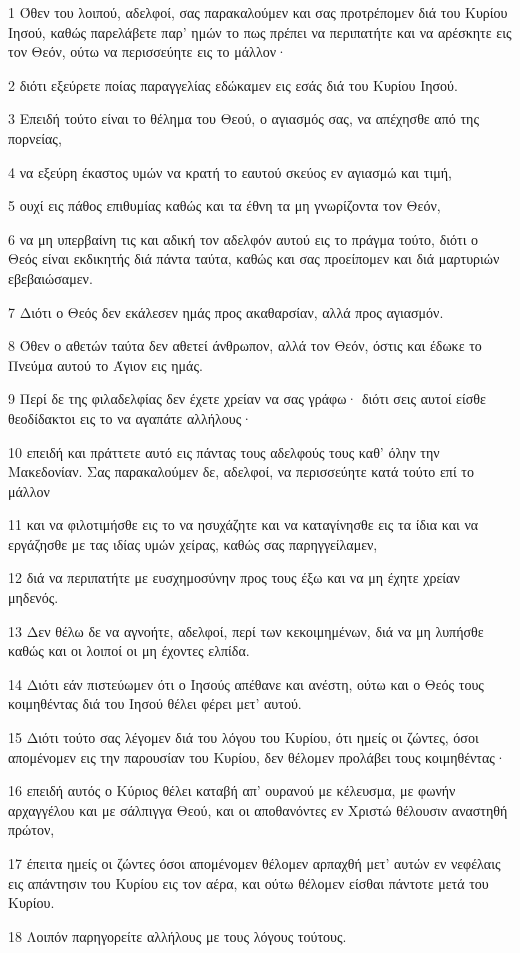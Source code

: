 \par 1 Όθεν του λοιπού, αδελφοί, σας παρακαλούμεν και σας προτρέπομεν διά του Κυρίου Ιησού, καθώς παρελάβετε παρ' ημών το πως πρέπει να περιπατήτε και να αρέσκητε εις τον Θεόν, ούτω να περισσεύητε εις το μάλλον·
\par 2 διότι εξεύρετε ποίας παραγγελίας εδώκαμεν εις εσάς διά του Κυρίου Ιησού.
\par 3 Επειδή τούτο είναι το θέλημα του Θεού, ο αγιασμός σας, να απέχησθε από της πορνείας,
\par 4 να εξεύρη έκαστος υμών να κρατή το εαυτού σκεύος εν αγιασμώ και τιμή,
\par 5 ουχί εις πάθος επιθυμίας καθώς και τα έθνη τα μη γνωρίζοντα τον Θεόν,
\par 6 να μη υπερβαίνη τις και αδική τον αδελφόν αυτού εις το πράγμα τούτο, διότι ο Θεός είναι εκδικητής διά πάντα ταύτα, καθώς και σας προείπομεν και διά μαρτυριών εβεβαιώσαμεν.
\par 7 Διότι ο Θεός δεν εκάλεσεν ημάς προς ακαθαρσίαν, αλλά προς αγιασμόν.
\par 8 Όθεν ο αθετών ταύτα δεν αθετεί άνθρωπον, αλλά τον Θεόν, όστις και έδωκε το Πνεύμα αυτού το Άγιον εις ημάς.
\par 9 Περί δε της φιλαδελφίας δεν έχετε χρείαν να σας γράφω· διότι σεις αυτοί είσθε θεοδίδακτοι εις το να αγαπάτε αλλήλους·
\par 10 επειδή και πράττετε αυτό εις πάντας τους αδελφούς τους καθ' όλην την Μακεδονίαν. Σας παρακαλούμεν δε, αδελφοί, να περισσεύητε κατά τούτο επί το μάλλον
\par 11 και να φιλοτιμήσθε εις το να ησυχάζητε και να καταγίνησθε εις τα ίδια και να εργάζησθε με τας ιδίας υμών χείρας, καθώς σας παρηγγείλαμεν,
\par 12 διά να περιπατήτε με ευσχημοσύνην προς τους έξω και να μη έχητε χρείαν μηδενός.
\par 13 Δεν θέλω δε να αγνοήτε, αδελφοί, περί των κεκοιμημένων, διά να μη λυπήσθε καθώς και οι λοιποί οι μη έχοντες ελπίδα.
\par 14 Διότι εάν πιστεύωμεν ότι ο Ιησούς απέθανε και ανέστη, ούτω και ο Θεός τους κοιμηθέντας διά του Ιησού θέλει φέρει μετ' αυτού.
\par 15 Διότι τούτο σας λέγομεν διά του λόγου του Κυρίου, ότι ημείς οι ζώντες, όσοι απομένομεν εις την παρουσίαν του Κυρίου, δεν θέλομεν προλάβει τους κοιμηθέντας·
\par 16 επειδή αυτός ο Κύριος θέλει καταβή απ' ουρανού με κέλευσμα, με φωνήν αρχαγγέλου και με σάλπιγγα Θεού, και οι αποθανόντες εν Χριστώ θέλουσιν αναστηθή πρώτον,
\par 17 έπειτα ημείς οι ζώντες όσοι απομένομεν θέλομεν αρπαχθή μετ' αυτών εν νεφέλαις εις απάντησιν του Κυρίου εις τον αέρα, και ούτω θέλομεν είσθαι πάντοτε μετά του Κυρίου.
\par 18 Λοιπόν παρηγορείτε αλλήλους με τους λόγους τούτους.

